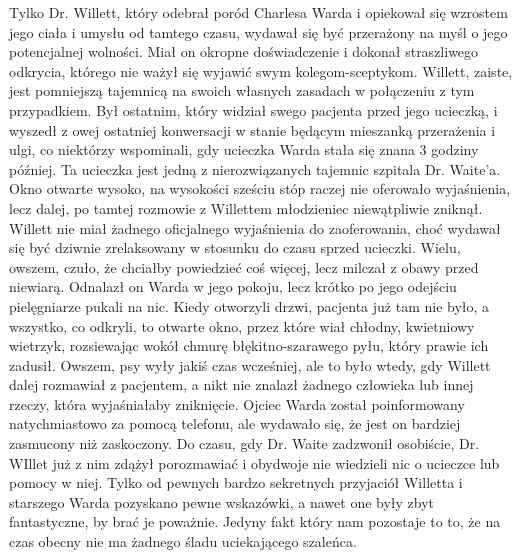 Tylko Dr. Willett, który odebrał poród Charlesa Warda i opiekował się wzrostem jego ciała i umysłu od tamtego czasu, wydawał się być przerażony na myśl o jego potencjalnej wolności. Miał on okropne doświadczenie i dokonał straszliwego odkrycia, którego nie ważył się wyjawić swym kolegom-sceptykom. Willett, zaiste, jest pomniejszą tajemnicą na swoich własnych zasadach w połączeniu z tym przypadkiem. Był ostatnim, który widział swego pacjenta przed jego ucieczką, i wyszedł z owej ostatniej konwersacji w stanie będącym mieszanką przerażenia i ulgi, co niektórzy wspominali, gdy ucieczka Warda stała się znana 3 godziny później. Ta ucieczka jest jedną z nierozwiązanych tajemnic szpitala Dr. Waite'a. Okno otwarte wysoko, na wysokości sześciu stóp raczej nie oferowało wyjaśnienia, lecz dalej, po tamtej rozmowie z Willettem młodzieniec niewątpliwie zniknął. Willett nie miał żadnego oficjalnego wyjaśnienia do zaoferowania, choć wydawał się być dziwnie zrelaksowany w stosunku do czasu sprzed ucieczki. Wielu, owszem, czuło, że chciałby powiedzieć coś więcej, lecz milczał z obawy przed niewiarą. Odnalazł on Warda w jego pokoju, lecz krótko po jego odejściu pielęgniarze pukali na nic. Kiedy otworzyli drzwi, pacjenta już tam nie było, a wszystko, co odkryli, to otwarte okno, przez które wiał chłodny, kwietniowy wietrzyk, rozsiewając wokół chmurę błękitno-szarawego pyłu, który prawie ich zadusił. Owszem, psy wyły jakiś czas wcześniej, ale to było wtedy, gdy Willett dalej rozmawiał z pacjentem, a nikt nie znalazł żadnego człowieka lub innej rzeczy, która wyjaśniałaby zniknięcie. Ojciec Warda został poinformowany natychmiastowo za pomocą telefonu, ale wydawało się, że jest on bardziej zasmucony niż zaskoczony. Do czasu, gdy Dr. Waite zadzwonił osobiście, Dr. WIllet już z nim zdążył porozmawiać i obydwoje nie wiedzieli nic o ucieczce lub pomocy w niej. Tylko od pewnych bardzo sekretnych przyjaciół Willetta i starszego Warda pozyskano pewne wskazówki, a nawet one były zbyt fantastyczne, by brać je poważnie. Jedyny fakt który nam pozostaje to to, że na czas obecny nie ma żadnego śladu uciekającego szaleńca.

